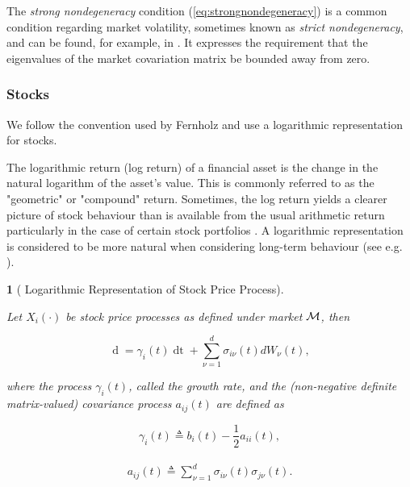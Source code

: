 \documentclass[british]{amsart} \usepackage{lmodern}
\numberwithin{equation}{section} \numberwithin{figure}{section}
\theoremstyle{plain} \newtheorem{thm}{\protect\theoremname}[section]
\theoremstyle{definition} \newtheorem{defn}[thm]{\protect\definitionname}
\theoremstyle{plain} \newtheorem{assumption}[thm]{\protect\assumptionname}
\theoremstyle{plain} \newtheorem{lem}[thm]{\protect\lemmaname}
\theoremstyle{plain} \newtheorem{prop}[thm]{\protect\propositionname}
\theoremstyle{remark} \newtheorem{rem}[thm]{\protect\remarkname}
\theoremstyle{plain} \newtheorem{cor}[thm]{\protect\corollaryname}
\renewcommand{\d}[1]{\mathop{\mathrm{d}{#1}}}
\newcommand{\defeq}{\mathop{\triangleq}} \newcommand{\almostsurely}{\text{a.s.}}
\begin{document}
The \textit{strong nondegeneracy} condition (\ref{eq:strongnondegeneracy}) is a 
common condition regarding market volatility, sometimes known as \textit{strict
nondegeneracy}, and can be found, for example, in \cite{shreve1991}. It 
expresses the requirement that the eigenvalues of the market covariation 
matrix be bounded away from zero. 

\subsubsection{Stocks}

We follow the convention used by Fernholz and use a logarithmic representation
for stocks.

The logarithmic return (log return) of a financial asset is the change in the
natural logarithm of the asset's value. This is commonly referred to as the
"geometric" or "compound" return. Sometimes, the log return yields a clearer
picture of stock behaviour than is available from the usual arithmetic return
particularly in the case of certain stock portfolios
\cite{fernholz2007statistics}. A logarithmic representation is considered to be
more natural when considering long-term behaviour (see e.g.
\cite{fernholz1982}).

\begin{prop} [
  {\cite[Equation 1.5]{fernholz2009}} 
  Logarithmic Representation of Stock Price Process]
  \label{thm:logarithmicrepresentation}

  Let $X_{i}(\cdot)$ be stock price processes as defined under market $\mathcal{M}$,
  then

  \begin{equation}
    \label{eq:dlogX}
        \d{\log{X_{i}(t)}} =
          \gamma_{i}(t) \d{t} +
          \sum_{\nu=1}^{d} \sigma_{i\nu}(t) dW_{\nu}(t),
  \end{equation}

  where the process $\gamma_{i}(t)$, called the \textit{growth rate}, and the
  (non-negative definite matrix-valued) \textit{covariance process} $a_{ij}(t)$
  are defined as

  \begin{equation}
    \label{eq:gamma}
    \gamma_{i}(t)\defeq b_{i}(t)-\frac{1}{2}a_{ii}(t),
  \end{equation}

  \begin{gather}
    \label{eq:covarianceprocess}
    \begin{split}
      a_{ij}(t)
         \defeq \sum_{\nu=1}^{d}\sigma_{i\nu}(t)\sigma_{j\nu}(t).
    \end{split}
  \end{gather}

\end{prop}
\end{document}
